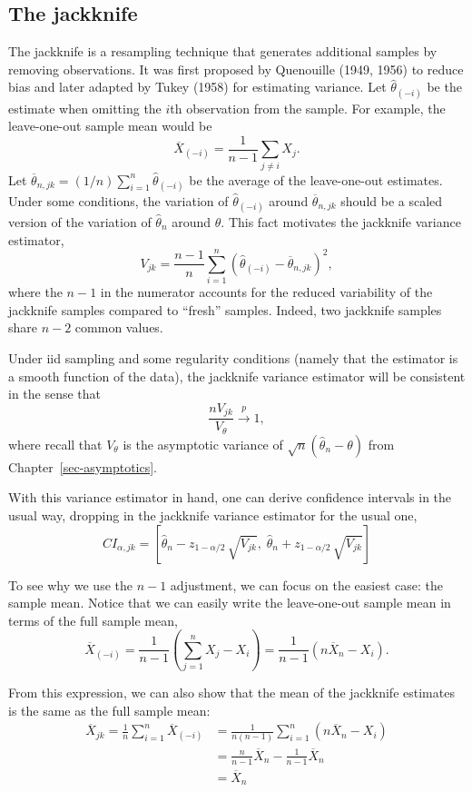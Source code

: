 \documentclass[
  13pt,
  letterpaper,
  DIV=11,
  numbers=noendperiod]{scrreprt}
\newcommand{\Xbar}{\overline{X}}
\newcommand{\inprob}{\overset{p}{\to}}
\theoremstyle{plain}
\theoremstyle{plain}
\theoremstyle{definition}
\theoremstyle{definition}
\theoremstyle{remark}
\begin{document}
\subsection{The jackknife}\label{the-jackknife}

The jackknife is a resampling technique that generates additional
samples by removing observations. It was first proposed by Quenouille
(1949, 1956) to reduce bias and later adapted by Tukey (1958) for
estimating variance. Let \(\widehat{\theta}_{(-i)}\) be the estimate
when omitting the \(i\)th observation from the sample. For example, the
leave-one-out sample mean would be \[
\Xbar_{(-i)} = \frac{1}{n-1} \sum_{j \neq i} X_j.
\] Let
\(\overline{\theta}_{n,jk} = (1/n) \sum_{i=1}^n \widehat{\theta}_{(-i)}\)
be the average of the leave-one-out estimates. Under some conditions,
the variation of \(\widehat{\theta}_{(-i)}\) around
\(\overline{\theta}_{n,jk}\) should be a scaled version of the variation
of \(\widehat{\theta}_{n}\) around \(\theta\). This fact motivates the
jackknife variance estimator, \[
V_{jk} = \frac{n-1}{n} \sum_{i=1}^n \left(\widehat{\theta}_{(-i)} - \overline{\theta}_{n,jk}\right)^2,
\] where the \(n-1\) in the numerator accounts for the reduced
variability of the jackknife samples compared to ``fresh'' samples.
Indeed, two jackknife samples share \(n-2\) common values.

Under iid sampling and some regularity conditions (namely that the
estimator is a smooth function of the data), the jackknife variance
estimator will be consistent in the sense that \[
\frac{nV_{jk}}{V_{\theta}} \inprob 1,
\] where recall that \(V_{\theta}\) is the asymptotic variance of
\(\sqrt{n}(\widehat{\theta}_n - \theta)\) from
Chapter~\ref{sec-asymptotics}.

With this variance estimator in hand, one can derive confidence
intervals in the usual way, dropping in the jackknife variance estimator
for the usual one, \[
CI_{\alpha, jk} = \left[\widehat{\theta}_n - z_{1-\alpha/2}\,\sqrt{V_{jk}},\; \widehat{\theta}_n + z_{1-\alpha/2}\,\sqrt{V_{jk}} \right] 
\]

To see why we use the \(n-1\) adjustment, we can focus on the easiest
case: the sample mean. Notice that we can easily write the leave-one-out
sample mean in terms of the full sample mean, \[
\Xbar_{(-i)} = \frac{1}{n-1}\left(\sum_{j=1} ^n X_j - X_i \right) = \frac{1}{n-1}\left(n\Xbar_{n} - X_i \right). 
\]

From this expression, we can also show that the mean of the jackknife
estimates is the same as the full sample mean: \[
\begin{aligned}
\Xbar_{jk} = \frac{1}{n} \sum_{i=1}^n \Xbar_{(-i)} &= \frac{1}{n(n-1)} \sum_{i=1}^n \left(n\Xbar_{n} - X_i\right) \\
&= \frac{n}{n-1} \Xbar_n - \frac{1}{n-1} \Xbar_n \\
&= \Xbar_n
\end{aligned}
\]
\end{document}

